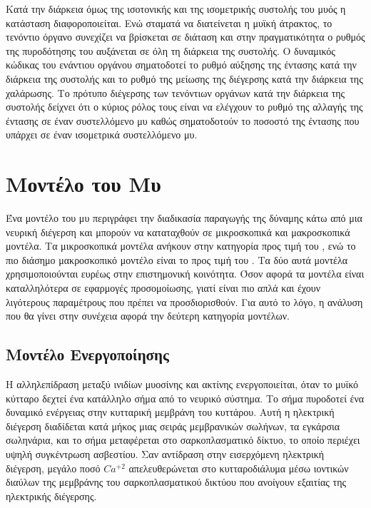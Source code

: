Κατά την διάρκεια όμως της ισοτονικής και της ισομετρικής συστολής του μυός η κατάσταση διαφοροποιείται. Ενώ σταματά να διατείνεται η μυϊκή άτρακτος, το τενόντιο όργανο συνεχίζει να βρίσκεται σε διάταση και στην πραγματικότητα ο ρυθμός της πυροδότησης του αυξάνεται σε όλη τη διάρκεια της συστολής. Ο δυναμικός κώδικας του ενάντιου οργάνου σηματοδοτεί το ρυθμό αύξησης της έντασης κατά την διάρκεια της συστολής και το ρυθμό της μείωσης της διέγερσης κατά την διάρκεια της χαλάρωσης. Το πρότυπο διέγερσης των τενόντιων οργάνων κατά την διάρκεια της συστολής δείχνει ότι ο κύριος ρόλος τους είναι να ελέγχουν το ρυθμό της αλλαγής της έντασης σε έναν συστελλόμενο μυ καθώς σηματοδοτούν το ποσοστό της έντασης που υπάρχει σε έναν ισομετρικά συστελλόμενο μυ.

\section{Μοντέλο του Μυ}

Ένα μοντέλο του μυ περιγράφει την διαδικασία παραγωγής της δύναμης κάτω από μια νευρική διέγερση και μπορούν να καταταχθούν σε μικροσκοπικά και μακροσκοπικά μοντέλα. Τα μικροσκοπικά μοντέλα ανήκουν στην κατηγορία  προς τιμή του , ενώ το πιο διάσημο μακροσκοπικό μοντέλο είναι το  προς τιμή του . Τα δύο αυτά μοντέλα χρησιμοποιούνται ευρέως στην επιστημονική κοινότητα. Όσον αφορά τα μοντέλα  είναι καταλληλότερα σε εφαρμογές προσομοίωσης, γιατί είναι πιο απλά και έχουν λιγότερους παραμέτρους που πρέπει να προσδιορισθούν. Για αυτό το λόγο, η ανάλυση που θα γίνει στην συνέχεια αφορά την δεύτερη κατηγορία μοντέλων.

\subsection{Μοντέλο Ενεργοποίησης}

Η αλληλεπίδραση μεταξύ ινιδίων μυοσίνης και ακτίνης ενεργοποιείται, όταν το μυϊκό κύτταρο δεχτεί ένα κατάλληλο σήμα από το νευρικό σύστημα. Το σήμα πυροδοτεί ένα δυναμικό ενέργειας στην κυτταρική μεμβράνη του κυττάρου. Αυτή η ηλεκτρική διέγερση διαδίδεται κατά μήκος μιας σειράς μεμβρανικών σωλήνων, τα εγκάρσια σωληνάρια, και το σήμα μεταφέρεται στο σαρκοπλασματικό δίκτυο, το οποίο περιέχει υψηλή συγκέντρωση ασβεστίου. Σαν αντίδραση στην εισερχόμενη ηλεκτρική διέγερση, μεγάλο ποσό $Ca^{+2}$ απελευθερώνεται στο κυτταροδιάλυμα μέσω ιοντικών διαύλων της μεμβράνης του σαρκοπλασματικού δικτύου που ανοίγουν εξαιτίας της ηλεκτρικής διέγερσης.

